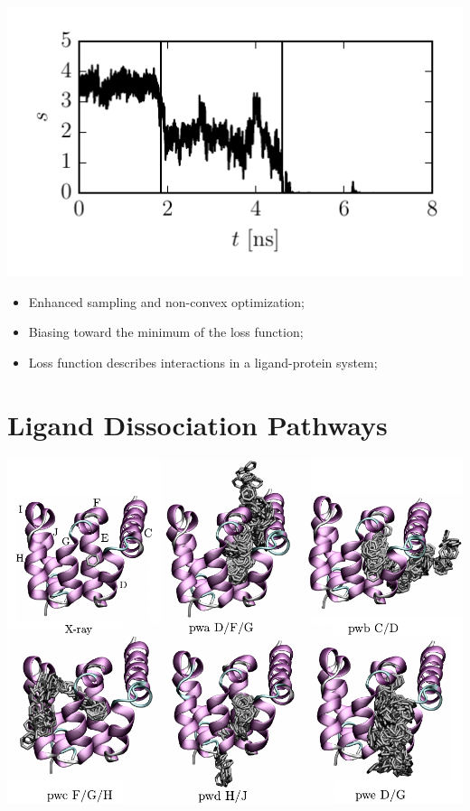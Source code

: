 \documentclass[a0,portrait]{a0poster}
\newcommand{\bi}{\item[\color{myblue}\ding{108}]}
\begin{document}
\begin{multicols}{2}
\begin{minipage}[b]{\linewidth}
\end{minipage}

\begin{minipage}[b]{0.5\linewidth}
  \centering
  \includegraphics[width=20cm]{../fig/fig_2.pdf}
\end{minipage}
\hspace{1cm}
\begin{minipage}[b]{0.4\linewidth}
  \begin{itemize}
    \bi Enhanced sampling and non-convex optimization;
    \bi Biasing toward the minimum of the loss function;
    \bi Loss function describes interactions in a ligand-protein system;
  \end{itemize}
  \vspace*{1cm}
\end{minipage}

\section*{\huge\centering\color{myblue}Ligand Dissociation Pathways}
\vspace*{1cm}
\begin{minipage}[b]{\linewidth}
  \centering
  \includegraphics[width=38cm]{../fig/fig_3.pdf}
\end{minipage}


\end{multicols}
\end{document}
